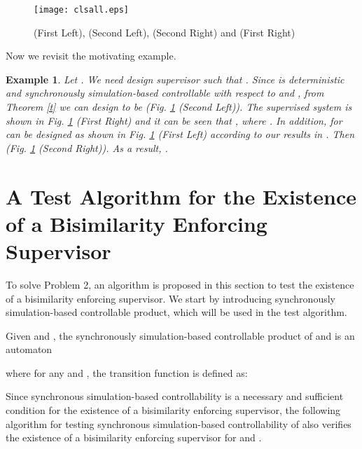 \documentclass[preprint,authoryear,12pt]{elsarticle}
\newtheorem{Example}{Example}
\begin{document}
\begin{figure}[!htb]
\begin{center}
\texttt{[image: clsall.eps]}
\caption{  (First Left),  (Second Left), 
(Second Right) and  (First Right)} \label{moticls}
\end{center}
\end{figure}


Now we revisit the motivating example.

\begin{Example}\label{lcbis}
Let . We need design supervisor  such that
. Since  is deterministic and
synchronously simulation-based controllable with respect to 
and , from Theorem \ref{t} we can design
 to be  (Fig. \ref{moticls} (Second Left)).
The supervised system  is shown in Fig. \ref{moticls}
(First Right) and it can be seen that , where  . In addition,
 for  can be designed as shown in Fig. \ref{moticls}
(First Left) according to our results in
\citep{sun2012bisimilarityacc}. Then 
(Fig. \ref{moticls} (Second Right)). As a result, .
\end{Example}






\section{A Test Algorithm for the Existence of a Bisimilarity
Enforcing Supervisor}

To solve Problem 2, an algorithm is proposed in this section to
test the existence of a bisimilarity enforcing supervisor. We
start by introducing synchronously simulation-based controllable
product, which will be used in the test algorithm.




\begin{Definition}
Given  and , the synchronously
simulation-based controllable product of  and  is an
automaton

where for any  and , the transition function is defined as:


\end{Definition}

Since synchronous simulation-based controllability is a necessary
and sufficient condition for the existence of a bisimilarity
enforcing supervisor, the following algorithm for testing
synchronous simulation-based controllability of  also verifies
the existence of a bisimilarity enforcing supervisor for  and
.
\end{document}

